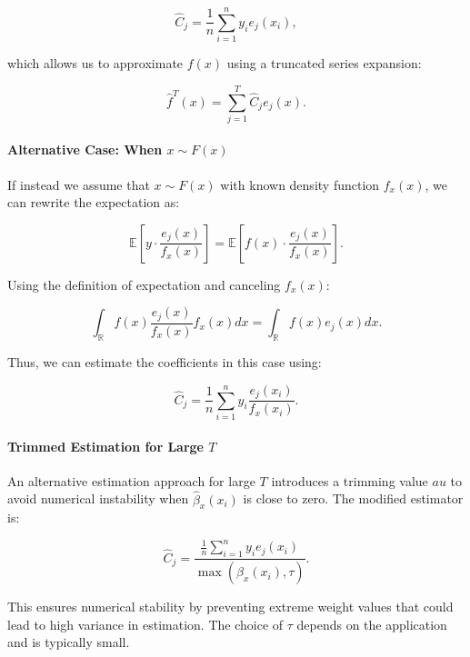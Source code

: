 \documentclass{article}
\begin{document}
 $$
 \hat{C}_j = \frac{1}{n} \sum_{i=1}^{n} y_i e_j(x_i),
 $$
 
 which allows us to approximate \(f(x)\) using a truncated series expansion:
 
 $$
 \hat{f}^{T}(x) = \sum_{j=1}^{T} \hat{C}_j e_j(x).
 $$
 
 \paragraph{Alternative Case: When \(x \sim F(x)\)}
 
 If instead we assume that \(x \sim F(x)\) with known density function \(f_x(x)\), we can rewrite the expectation as:
 
 $$
 \mathbb{E} \left[y \cdot \frac{e_j(x)}{f_x(x)}\right] = \mathbb{E} \left[f(x) \cdot \frac{e_j(x)}{f_x(x)}\right].
 $$
 
 Using the definition of expectation and canceling \(f_x(x)\):
 
 $$
 \int_{\mathbb{R}} f(x) \frac{e_j(x)}{f_x(x)} f_x(x) dx = \int_{\mathbb{R}} f(x) e_j(x) dx.
 $$
 
 Thus, we can estimate the coefficients in this case using:
 
 $$
 \hat{C}_j = \frac{1}{n} \sum_{i=1}^{n} y_i \frac{e_j(x_i)}{f_x(x_i)}.
 $$
 
 \paragraph{Trimmed Estimation for Large \(T\)}
 
 An alternative estimation approach for large \(T\) introduces a trimming value \(	au\) to avoid numerical instability when \(\hat{\beta}_x(x_i)\) is close to zero. The modified estimator is:
 
 $$
 \hat{C}_j = \frac{\frac{1}{n} \sum_{i=1}^{n} y_i e_j(x_i)}{\max(\hat{\beta}_x(x_i), \tau)}.
 $$
 
 This ensures numerical stability by preventing extreme weight values that could lead to high variance in estimation. The choice of \(\tau\) depends on the application and is typically small.
 
 
\end{document}
